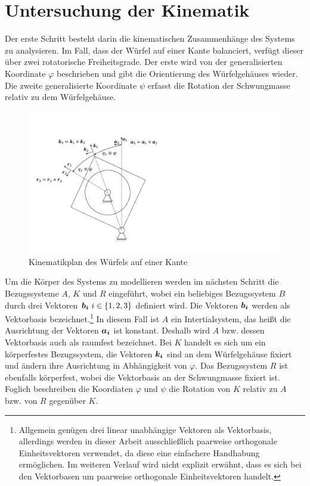 \section{Untersuchung der Kinematik}
Der erste Schritt besteht darin die kinematischen Zusammenhänge des Systems zu analysieren. Im Fall, dass der Würfel auf einer Kante balanciert, verfügt dieser über zwei rotatorische Freiheitsgrade. Der erste wird von der generalisierten Koordinate $\varphi$ beschrieben und gibt die Orientierung des Würfelgehäuses wieder. Die zweite generalisierte Koordinate $\psi$ erfasst die Rotation der Schwungmasse relativ zu dem Würfelgehäuse.
\begin{figure}[!ht]
\centering
\includegraphics[width=0.6\linewidth, trim={1cm 1.5cm 18cm 3.5cm}, clip]{img/ModellWuerfelseite}
\caption{Kinematikplan des Würfels auf einer Kante}
\label{skizze_dynamik_edge}
\end{figure}

Um die Körper des Systems zu modellieren werden im nächsten Schritt die Bezugssysteme $A$, $K$ und $R$ eingeführt, wobei ein beliebiges Bezugssystem $B$ durch drei Vektoren $\boldsymbol{b_i} \ i \in \{1,2,3\}$ definiert wird. Die Vektoren $\boldsymbol{b_i}$ werden als Vektorbasis bezeichnet.\footnote{Allgemein genügen drei linear unabhängige Vektoren als Vektorbasis, allerdings werden in dieser Arbeit ausschließlich paarweise orthogonale Einheitsvektoren verwendet, da diese eine einfachere Handhabung ermöglichen. Im weiteren Verlauf wird nicht explizit erwähnt, dass es sich bei den Vektorbasen um paarweise orthogonale Einheitsvektoren handelt.} In diesem Fall ist $A$ ein Intertialsystem, das heißt die Ausrichtung der Vektoren $\boldsymbol{a_i}$ ist konstant. Deshalb wird $A$ bzw. dessen Vektorbasis auch als raumfest bezeichnet. Bei $K$ handelt es sich um ein körperfestes Bezugssystem, die Vektoren $\boldsymbol{k_i}$ sind an dem Würfelgehäuse fixiert und ändern ihre Ausrichtung in Abhängigkeit von $\varphi$. Das Bezugssystem $R$ ist ebenfalls körperfest, wobei die Vektorbasis an der Schwungmasse fixiert ist. Foglich beschreiben die Koordiaten $\varphi$ und $\psi$ die Rotation von $K$ relativ zu $A$ bzw. von $R$ gegenüber $K$. 

